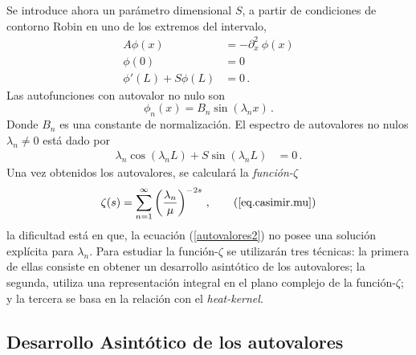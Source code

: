 Se introduce ahora un parámetro dimensional $S$, a partir de condiciones de contorno Robin en uno de los extremos del intervalo,
\begin{equation}
\begin{aligned}
    A \phi (x) &= - \partial ^2 _x \ \phi (x)  \\[5pt]
    \phi (0) &= 0 \\[5pt]
    \phi ' (L) + S \phi (L) &= 0 \, .
\end{aligned}
\end{equation}
Las autofunciones con autovalor no nulo son
\begin{equation}
\phi _n (x) = 
B _n \sin ( \lambda _n x ) \, .
\end{equation}
Donde $B_n$ es una constante de normalización. El espectro de autovalores no nulos $\lambda _n \neq 0 $ está dado por
\begin{align}
    \lambda _n   \cos( \lambda _n L) +  S \sin( \lambda _n L) &= 0
    \, . \label{autovalores2} 
\end{align}
Una vez obtenidos los autovalores, se calculará la {\it función-$\zeta$}
\begin{equation}
    \zeta (s) =  \sum_{n = 1} ^{ \infty } \left( \frac{\lambda _n}{\mu } \right) ^ {-2 s} \, ,
    \tag{\ref{eq.casimir.mu}}
\end{equation}
la dificultad está en que, la ecuación (\ref{autovalores2}) no posee una solución explícita para $\lambda _n$. Para estudiar la función-$\zeta$ se utilizarán tres técnicas: la primera de ellas consiste en obtener un desarrollo asintótico de los autovalores; la segunda, utiliza una representación integral en el plano complejo de la función-$\zeta$; y la tercera se basa en la relación con el {\it heat-kernel}. 

\subsection{Desarrollo Asintótico de los autovalores}{\label{seq.asin}}

